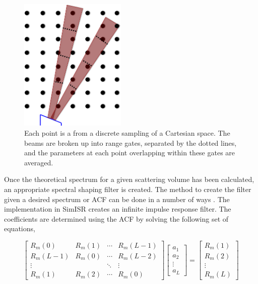 \documentclass[draft,ras]{agutex}
\begin{document}
\begin{article}
\begin{figure}[!t]
\centering
\includegraphics[width=2in]{beamsampling}
\caption{Each point is a from a discrete sampling of a Cartesian space. The beams are broken up into range gates, separated by the dotted lines, and the parameters at each point overlapping within these gates are averaged.}
\label{fig:beamdia}
\end{figure}
 


Once the theoretical spectrum for a given scattering volume has been calculated, an appropriate spectral shaping filter is created. The method to create the filter given a desired spectrum or ACF can be done in a number of ways \citep{Kasdin:1995wi}. The implementation in SimISR creates an infinite impulse response filter. The coefficients are determined using the ACF by solving the following set of equations,

\begin{equation}
\label{eq:filtereq}
\begin{bmatrix} R_m(0) & R_m(1)& \cdots & R_m(L-1) \\ R_m(L-1) & R_m(0)& \cdots & R_m(L-2)\\ \vdots & &\ddots  & \vdots \\  R_m(1) & R_m(2) & \cdots & R_m(0) \end{bmatrix} \left[ \begin{array}{c} a_1\\ a_2\\\vdots \\ a_L \end{array} \right]=\left[ \begin{array}{c} R_m(1) \\ R_m(2)\\ \vdots \\R_m(L) \end{array} \right]
\end{equation}


\end{article}
\end{document}
